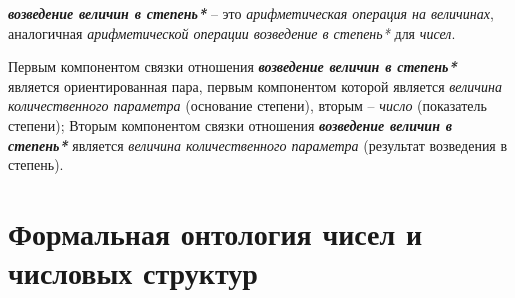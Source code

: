 \textbf{\textit{возведение величин в степень*}} -- это \textit{арифметическая операция на величинах}, аналогичная \textit{арифметической операции возведение в степень*} для \textit{чисел}.
		
Первым компонентом связки отношения \textbf{\textit{возведение величин в степень*}} является ориентированная пара, первым компонентом которой является \textit{величина количественного параметра} (основание степени), вторым -- \textit{число} (показатель степени); Вторым компонентом связки отношения \textbf{\textit{возведение величин в степень*}} является \textit{величина количественного параметра} (результат возведения в степень).
%	
	
\begin{SCn}
	
\end{SCn}	

\section{Формальная онтология чисел и числовых структур}

